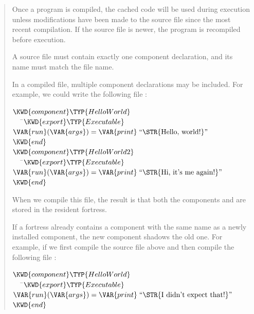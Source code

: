 \begin{description}
\begin{quote}
\begin{itemize}
Once a program is compiled, the cached code will be used during execution unless
modifications have been made to the source file since the most recent compilation.
If the source file is newer, the program is recompiled before execution.

\end{itemize}

A source file must contain exactly one component declaration, and its name must
match the file name.

In a compiled file,
multiple component declarations may be included.
For example, we could write the following file
:

%
\begin{Fortress}
\(\KWD{component} \TYP{HelloWorld}\)\\
{\tt~~~}\pushtabs\=\+\(   \KWD{export} \TYP{Executable}\)\\
\(   \VAR{run}(\VAR{args}) = \VAR{print}\;\hbox{\rm``\STR{Hello,~world!}''}\)\-\\\poptabs
\(\KWD{end}\)\\[4pt]
\(\KWD{component} \TYP{HelloWorld2}\)\\
{\tt~~~}\pushtabs\=\+\(   \KWD{export} \TYP{Executable}\)\\
\(   \VAR{run}(\VAR{args}) = \VAR{print}\;\hbox{\rm``\STR{Hi,~it's~me~again!}''}\)\-\\\poptabs
\(\KWD{end}\)
\end{Fortress}

When we compile this file, the result is that both the components
 and  are stored in the resident fortress.

If a fortress already contains a component with the same name as a
newly installed component, the new component shadows the old one. For
example, if we first compile the source file 
above and then compile the following file :

\begin{Fortress}
\(\KWD{component} \TYP{HelloWorld}\)\\
{\tt~~~}\pushtabs\=\+\(   \KWD{export} \TYP{Executable}\)\\
\(   \VAR{run}(\VAR{args}) = \VAR{print}\;\hbox{\rm``\STR{I~didn't~expect~that!}''}\)\-\\\poptabs
\(\KWD{end}\)
\end{Fortress}


\end{quote}
\end{description}
